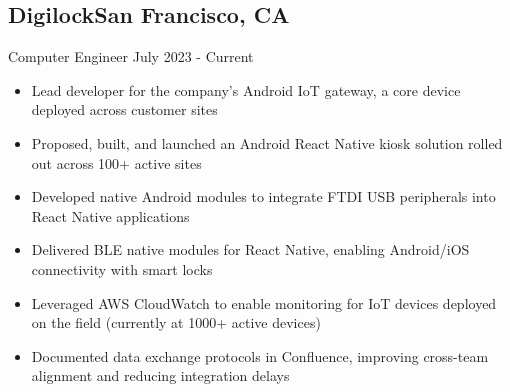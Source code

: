 \documentclass[a4,10pt]{article}
\newcommand{\subtext}[1]{
#1\par\vspace{-0.2cm}}
\newenvironment{zitemize}{
\begin{itemize}\itemsep0pt \parskip0pt \parsep1pt}
{\end{itemize}\vspace{-0.5cm}}
\begin{document}

\subsection*{Digilock\hfill San Francisco, CA} 
\subtext{Computer Engineer \hfill July 2023 - Current} 
    \begin{zitemize}
        \item Lead developer for the company’s Android IoT gateway, a core device deployed across customer sites
        \item Proposed, built, and launched an Android React Native kiosk solution rolled out across 100+ active sites
        \item Developed native Android modules to integrate FTDI USB peripherals into React Native applications
        \item Delivered BLE native modules for React Native, enabling Android/iOS connectivity with smart locks
        \item Leveraged AWS CloudWatch to enable monitoring for IoT devices deployed on the field (currently at 1000+ active devices)
        \item Documented data exchange protocols in Confluence, improving cross-team alignment and reducing integration delays



        
    
    \end{zitemize}
\end{document}
